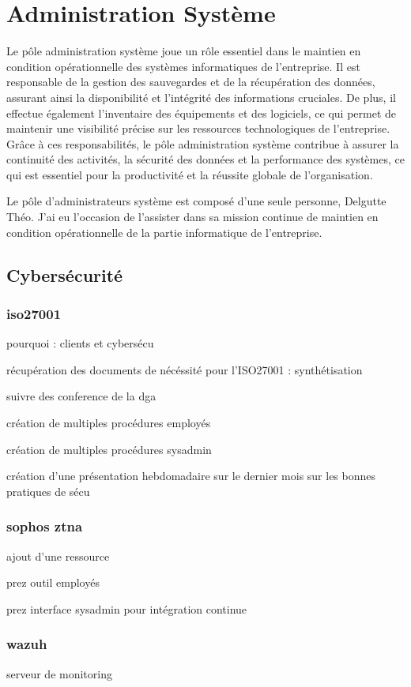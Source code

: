 \section{Administration Système}
Le pôle administration système joue un rôle essentiel dans le maintien en condition opérationnelle des systèmes informatiques de l'entreprise.
Il est responsable de la gestion des sauvegardes et de la récupération des données, assurant ainsi la disponibilité et l'intégrité des informations cruciales.
De plus, il effectue également l'inventaire des équipements et des logiciels, ce qui permet de maintenir une visibilité précise sur les ressources technologiques de l'entreprise.
Grâce à ces responsabilités, le pôle administration système contribue à assurer la continuité des activités, la sécurité des données et la performance des systèmes, ce qui est essentiel pour la productivité et la réussite globale de l'organisation.

Le pôle d'administrateurs système est composé d'une seule personne, Delgutte Théo.
J'ai eu l'occasion de l'assister dans sa mission continue de maintien en condition opérationnelle de la partie informatique de l'entreprise.

\subsection{Cybersécurité}
\subsubsection{iso27001}
pourquoi : clients et cybersécu

récupération des documents de nécéssité pour l'ISO27001 : synthétisation

suivre des conference de la dga

création de multiples procédures employés

création de multiples procédures sysadmin

création d'une présentation hebdomadaire sur le dernier mois sur les bonnes pratiques de sécu

\subsubsection{sophos ztna}
ajout d'une ressource 

prez outil employés

prez interface sysadmin pour intégration continue   

\subsubsection{wazuh}
serveur de monitoring

